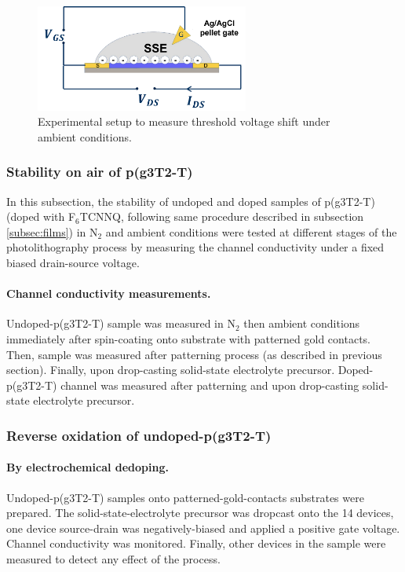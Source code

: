 \begin{figure}[!ht]
	\centering
	\includegraphics[width=7cm]{Images/pdf/bioprobe_setup.pdf}
	\caption{Experimental setup to measure threshold voltage shift under ambient conditions.}
	\label{fig:biosetup}
\end{figure}

\subsubsection{Stability on air of p(g3T2-T)}
In this subsection, the stability of undoped and doped samples of p(g3T2-T) (doped with F$_{6}$TCNNQ, following same procedure described in subsection \ref{subsec:films}) in N$_{2}$ and ambient conditions were tested at different stages of the photolithography process by measuring the channel conductivity under a fixed biased drain-source voltage. %

\paragraph{Channel conductivity measurements.}Undoped-p(g3T2-T) sample was measured in N$_{2}$ then ambient conditions immediately after spin-coating onto substrate with patterned gold contacts. Then, sample was measured after patterning process (as described in previous section). Finally, upon drop-casting solid-state electrolyte precursor. Doped-p(g3T2-T) channel was measured after patterning and upon drop-casting solid-state electrolyte precursor.

\subsubsection{Reverse oxidation of undoped-p(g3T2-T)}

\paragraph{By electrochemical dedoping.}Undoped-p(g3T2-T) samples onto patterned-gold-contacts substrates were prepared. The solid-state-electrolyte precursor was dropcast onto the 14 devices, one device source-drain was negatively-biased and applied a positive gate voltage. Channel conductivity was monitored. Finally, other devices in the sample were measured to detect any effect of the process.

